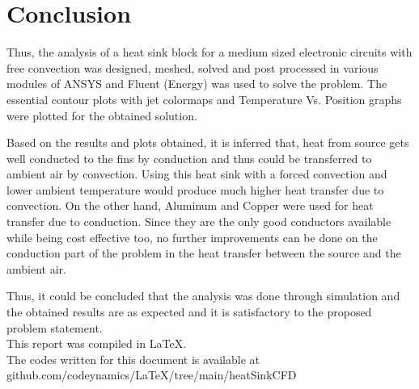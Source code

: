 \documentclass{article}
\begin{document}
\section{Conclusion}
Thus, the analysis of a heat sink block for a medium sized electronic circuits with free convection was designed, meshed, solved and post processed in various modules of ANSYS and Fluent (Energy) was used to solve the problem. The essential contour plots with jet colormaps and Temperature Vs. Position graphs were plotted for the obtained solution.

Based on the results and plots obtained, it is inferred that, heat from source gets well conducted to the fins by conduction and thus could be transferred to ambient air by convection. Using this heat sink with a forced convection and lower ambient temperature would produce much higher heat transfer due to convection. On the other hand, Aluminum and Copper were used for heat transfer due to conduction. Since they are the only good conductors available while being cost effective too, no further improvements can be done on the conduction part of the problem in the heat transfer between the source and the ambient air. 

Thus, it could be concluded that the analysis was done through simulation and the obtained results are as expected and it is satisfactory to the proposed problem statement. 
\vspace{2cm}\\
This report was compiled in \LaTeX. \\ The codes written for this document is available at github.com/codeynamics/LaTeX/tree/main/heatSinkCFD
\end{document}
